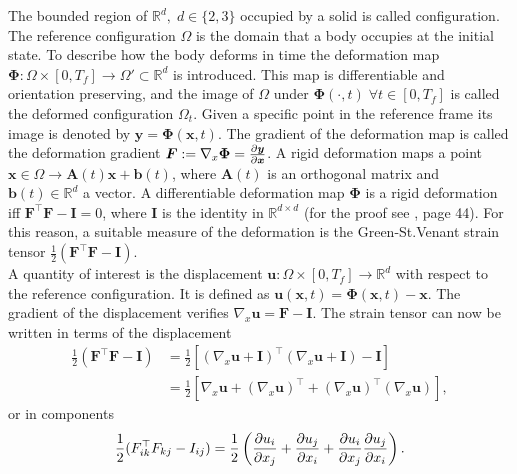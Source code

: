 The bounded region of $\mathbb{R}^d, \; d\in \{2, 3\}$ occupied by a solid is called configuration. The reference configuration $\Omega$ is the domain that a body occupies at the initial state. To describe how the body deforms in time the deformation map $\bm\Phi: \Omega \times [0, T_f] \rightarrow \Omega' \subset \mathbb{R}^d$ is introduced. This map is differentiable and orientation preserving, and the image of $\Omega$ under $\bm\Phi(\cdot, t) \; \forall t \in [0, T_f]$ is called the deformed configuration $\Omega_t$. Given a specific point in the reference frame its image is denoted by $\bm{y} = \bm{\Phi}(\bm{x}, t)$. The gradient of the deformation map is called the deformation gradient $\bm{F}:=\nabla_x\bm{\Phi} = \diffp{\bm{y}}{\bm{x}}$. A rigid deformation maps a point $\bm{x} \in \Omega \rightarrow \bm{A}(t) \bm{x} + \bm{b}(t)$, where $\bm{A}(t)$ is an orthogonal matrix and $\bm{b}(t) \in \mathbb{R}^d$ a vector. A differentiable deformation map $\bm\Phi$ is a rigid deformation iff $\bm{F}^\top \bm{F} - \bm{I} = 0$,  where $\bm{I}$ is the identity in $\mathbb{R}^{d\times d}$ (for the proof see \cite{ciarlet1988mathematical}, page 44). For this reason, a suitable measure of the deformation is the Green-St.Venant strain tensor $\frac{1}{2} (\bm{F}^\top \bm{F} - \bm{I})$.  \\
A quantity of interest is the displacement $\bm{u}: \Omega \times [0, T_f] \rightarrow \mathbb{R}^d$ with respect to the reference configuration. It is defined as $\bm{u}(\bm{x}, t) = \bm{\Phi}(\bm{x}, t) - \bm{x}$. The gradient of the displacement verifies $\nabla_x \bm{u} = \bm{F} - \bm{I}$. The strain tensor can now be written in terms of the displacement
\begin{equation*}
\begin{aligned}
\frac{1}{2} (\bm{F}^\top \bm{F} - \bm{I}) &= \frac{1}{2}\left[(\nabla_x \bm{u} + \bm{I})^\top (\nabla_x \bm{u} + \bm{I}) - \bm{I}\right] \\
&= \frac{1}{2}\left[\nabla_x \bm{u} + (\nabla_x \bm{u})^\top + (\nabla_x \bm{u})^\top (\nabla_x \bm{u})\right],
\end{aligned}
\end{equation*}
or in components 
\begin{equation*}
\frac{1}{2} ({F}_{ik}^\top {F}_{kj} - {I}_{ij}) = \frac{1}{2} \left(\diffp{u_i}{x_j} + \diffp{u_j}{x_i} + \diffp{u_i}{x_j}\diffp{u_j}{x_i}\right).
\end{equation*}

